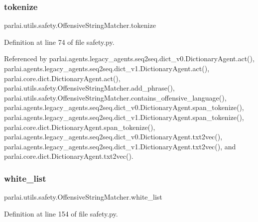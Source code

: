 \subsubsection{\texorpdfstring{tokenize}{tokenize}}
{\footnotesize\ttfamily parlai.\+utils.\+safety.\+Offensive\+String\+Matcher.\+tokenize}



Definition at line 74 of file safety.\+py.



Referenced by parlai.\+agents.\+legacy\+\_\+agents.\+seq2seq.\+dict\+\_\+v0.\+Dictionary\+Agent.\+act(), parlai.\+agents.\+legacy\+\_\+agents.\+seq2seq.\+dict\+\_\+v1.\+Dictionary\+Agent.\+act(), parlai.\+core.\+dict.\+Dictionary\+Agent.\+act(), parlai.\+utils.\+safety.\+Offensive\+String\+Matcher.\+add\+\_\+phrase(), parlai.\+utils.\+safety.\+Offensive\+String\+Matcher.\+contains\+\_\+offensive\+\_\+language(), parlai.\+agents.\+legacy\+\_\+agents.\+seq2seq.\+dict\+\_\+v0.\+Dictionary\+Agent.\+span\+\_\+tokenize(), parlai.\+agents.\+legacy\+\_\+agents.\+seq2seq.\+dict\+\_\+v1.\+Dictionary\+Agent.\+span\+\_\+tokenize(), parlai.\+core.\+dict.\+Dictionary\+Agent.\+span\+\_\+tokenize(), parlai.\+agents.\+legacy\+\_\+agents.\+seq2seq.\+dict\+\_\+v0.\+Dictionary\+Agent.\+txt2vec(), parlai.\+agents.\+legacy\+\_\+agents.\+seq2seq.\+dict\+\_\+v1.\+Dictionary\+Agent.\+txt2vec(), and parlai.\+core.\+dict.\+Dictionary\+Agent.\+txt2vec().

\mbox{\label{classparlai_1_1utils_1_1safety_1_1OffensiveStringMatcher_a65169673f0ff35c5e1f0258585540389}} 
\subsubsection{\texorpdfstring{white\+\_\+list}{white\_list}}
{\footnotesize\ttfamily parlai.\+utils.\+safety.\+Offensive\+String\+Matcher.\+white\+\_\+list}



Definition at line 154 of file safety.\+py.

\mbox{\label{classparlai_1_1utils_1_1safety_1_1OffensiveStringMatcher_aa880cf00a0354c45f576c3d933a1435e}} 
